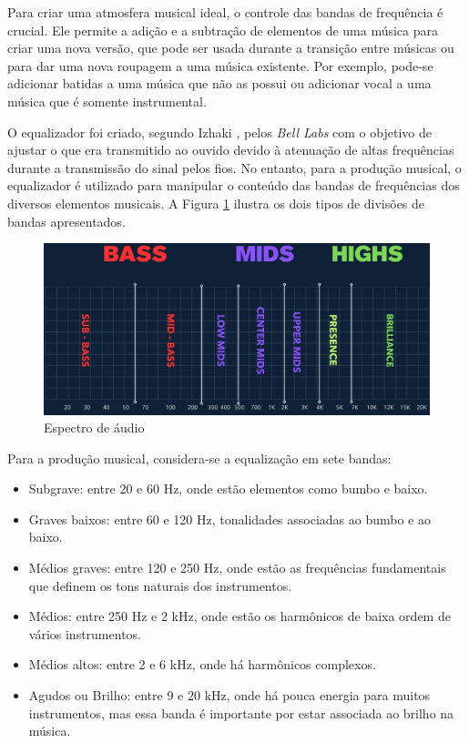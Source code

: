 Para criar uma atmosfera musical ideal, o controle das bandas de frequência é crucial. Ele permite a adição e a subtração de elementos de uma música para criar uma nova versão, que pode ser usada durante a transição entre músicas ou para dar uma nova roupagem a uma música existente. Por exemplo, pode-se adicionar batidas a uma música que não as possui ou adicionar vocal a uma música que é somente instrumental.

O equalizador foi criado, segundo Izhaki \cite{mixing}, pelos \textit{Bell Labs} com o objetivo de ajustar o que era transmitido ao ouvido devido à atenuação de altas frequências durante a transmissão do sinal pelos fios. No entanto, para a produção musical, o equalizador é utilizado para manipular o conteúdo das bandas de frequências dos diversos elementos musicais. A Figura \ref{fig09} ilustra os dois tipos de divisões de bandas apresentados.

\begin{figure}[h]
	\centering
    \includegraphics[scale=0.4]{figuras/fig09.eps}
	\caption{Espectro de áudio \cite{headphonestyAudioFrequency}}
	\label{fig09}
\end{figure}

Para a produção musical, considera-se a equalização em sete bandas:

\begin{itemize}
	\item Subgrave: entre 20 e 60 Hz, onde estão elementos como bumbo e baixo.
	\item Graves baixos: entre 60 e 120 Hz, tonalidades associadas ao bumbo e ao baixo.
	\item Médios graves: entre 120 e 250 Hz, onde estão as frequências fundamentais que definem os tons naturais dos instrumentos.
	\item Médios: entre 250 Hz e 2 kHz, onde estão os harmônicos de baixa ordem de vários instrumentos.
	\item Médios altos: entre 2 e 6 kHz, onde há harmônicos complexos.
	\item Agudos ou Brilho: entre 9 e 20 kHz, onde há pouca energia para muitos instrumentos, mas essa banda é importante por estar associada ao brilho na música.
\end{itemize}

